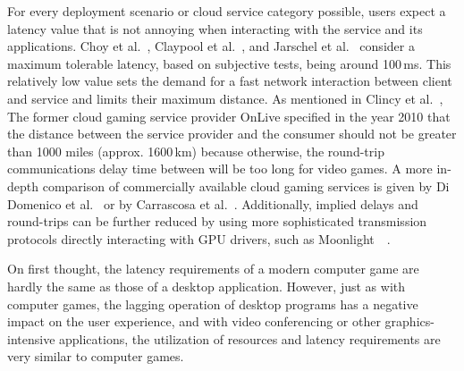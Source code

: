 \documentclass[runningheads]{llncs}
\begin{document}
For every deployment scenario or cloud service category possible,
users expect a latency value that is not annoying
when interacting with the service and its applications.
Choy et al.~\cite{ChoyWongSimonRosenberg2012},
Claypool et al.~\cite{claypool2010latency},
and Jarschel et al.~\cite{jarschel2011evaluation}
consider a maximum tolerable latency, based on subjective tests,
being around 100\,ms.
This relatively low value sets the demand for a fast network interaction
between client and service and limits their maximum distance.
As mentioned in Clincy et al.~\cite{clincy2013subjective},
The former cloud gaming service provider OnLive specified in the year 2010
that the distance between the service provider and the consumer
should not be greater than 1000 miles (approx. 1600\,km) because otherwise,
the round-trip communications delay time between will be too long for video games.
A more in-depth comparison of
commercially available cloud gaming services is given
by Di Domenico et al.~\cite{di2021network}
or by Carrascosa et al.~\cite{carrascosa2022cloud}.
Additionally, implied delays and round-trips can be further reduced
by using more sophisticated transmission protocols
directly interacting with GPU drivers,
such as Moonlight~\cite{hanimplementation}~\cite{darcy2022latency}.

On first thought, the latency requirements of a modern computer game
are hardly the same as those of a desktop application.
However, just as with computer games,
the lagging operation of desktop programs
has a negative impact on the user experience,
and with video conferencing or other graphics-intensive applications,
the utilization of resources and latency requirements
are very similar to computer games.
\end{document}
